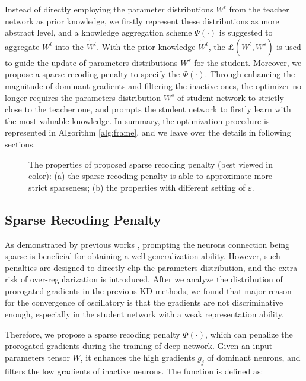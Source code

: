 \documentclass[10pt,twocolumn,letterpaper]{article}
\begin{document}
Instead of directly employing the parameter distributions $W^t$
from the teacher network as prior knowledge,
we firstly represent these distributions as more abstract level,
and a knowledge aggregation scheme $\Psi(\cdot)$ is suggested
to aggregate $W^t$ into the $\tilde{W^t}$.
With the prior knowledge $\tilde{W^t}$,
the $\pounds(\tilde{W^t}, W^s)$ is used to guide the
update of parameters distributions $W^s$ for the student.
Moreover,
we propose a sparse recoding penalty to specify the $\Phi(\cdot)$.
Through enhancing the magnitude of dominant gradients and filtering the inactive ones,
the optimizer no longer requires the parameters distribution $W^s$ of student network
to strictly close to the teacher one,
and prompts the student network to firstly learn with the most valuable knowledge.
In summary,
the optimization procedure is represented in Algorithm \ref{alg:frame},
and we leave over the details in following sections.

\begin{figure}[t]
  \centering
  \caption{The properties of proposed sparse recoding penalty (best viewed in color):
  (a) the sparse recoding penalty is able to approximate more strict sparseness;
  (b) the properties with different setting of $\varepsilon$.}
  \label{fig:sp-loss}
\end{figure}


\subsection{Sparse Recoding Penalty} \label{3dot2} As demonstrated by previous works \cite{wen2016learning, wu2017beyond, zhang2016l1},
prompting the neurons connection being sparse is beneficial for
obtaining a well generalization ability.
However,
such penalties are designed to directly clip the parameters distribution,
and the extra risk of over-regularization is introduced.
After we analyze the distribution of prorogated gradients in the previous KD methods,
we found that major reason for the convergence of oscillatory
is that the gradients are not discriminative enough,
especially in the student network with a weak representation ability.


Therefore,
we propose a sparse recoding penalty $\Phi(\cdot)$,
which can penalize the prorogated gradients during the training of deep network.
Given an input parameters tensor $W$,
it enhances the high gradients $g_j$ of dominant neurons,
and filters the low gradients of inactive neurons.
The function is defined as:
\end{document}
